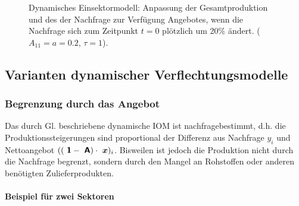 \begin{figure}
 \vspace{-4mm}

\caption{\label{fig:IOMdyn1}Dynamisches Einsektormodell: Anpassung der
Gesamtproduktion und des der Nachfrage zur Verf\"ugung
Angebotes, wenn die Nachfrage sich zum Zeitpunkt $t=0$ pl\"otzlich um
20\% \"andert. ($A_{11}=a=0.2$, $\tau=1$).
}
\end{figure}

\subsection{Varianten dynamischer Verflechtungsmodelle}

\subsubsection{Begrenzung durch das Angebot}

Das durch Gl.  beschriebene dynamische IOM ist
nachfragebestimmt, d.h. die Produktionssteigerungen sind proportional
der Differenz aus Nachfrage $y_i$ und Nettoangebot
$(({\mbox{ \sf\textbf{1}}}-{\mbox{ \sf\textbf{A}}})\cdot {\mbox{ \boldmath {$x$}}})_i$. Bisweilen ist jedoch die Produktion
nicht durch die Nachfrage begrenzt,  sondern durch den Mangel an
Rohstoffen oder anderen ben\"otigten Zulieferprodukten.

\paragraph{Beispiel f\"ur zwei Sektoren}

